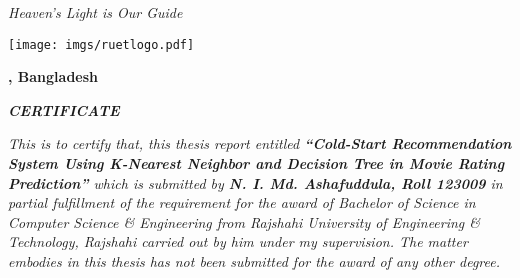 \documentclass[document.tex]{subfiles}
\begin{document}
	
	
	\begin{center}
		\textit{Heaven's Light is Our Guide}
		\vspace{1cm}
		
		\texttt{[image: imgs/ruetlogo.pdf]}
		
		\vspace{1cm}
		\textbf{{\fontsize{12pt}{0.5cm} \selectfont \dept}}
		
		\vspace{0.5cm}
		\textbf{{\fontsize{14pt}{0.5cm}\selectfont \ruet, Bangladesh}}
		
		\vspace{1cm}
		\textbf{{\fontsize{16pt}{0.5cm}\selectfont \textit{CERTIFICATE}}}
		
		\vspace{.5cm}
		
	\end{center}
	
	\noindent \textit{This is to certify that, this thesis report entitled \textbf{“Cold-Start Recommendation System Using K-Nearest Neighbor and Decision Tree in Movie Rating Prediction”} which is submitted by \textbf{N. I. Md. Ashafuddula, Roll 123009} in partial fulfillment of the requirement for the award of Bachelor of Science in Computer Science \& Engineering from Rajshahi University of Engineering \& Technology, Rajshahi carried out by him under my supervision. The matter embodies in this thesis has not been submitted for the award of any other degree.}
	
\end{document}
